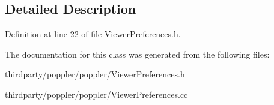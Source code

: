 \subsection{Detailed Description}


Definition at line 22 of file Viewer\+Preferences.\+h.



The documentation for this class was generated from the following files\+:\begin{DoxyCompactItemize}
\item 
thirdparty/poppler/poppler/Viewer\+Preferences.\+h\item 
thirdparty/poppler/poppler/Viewer\+Preferences.\+cc\end{DoxyCompactItemize}
